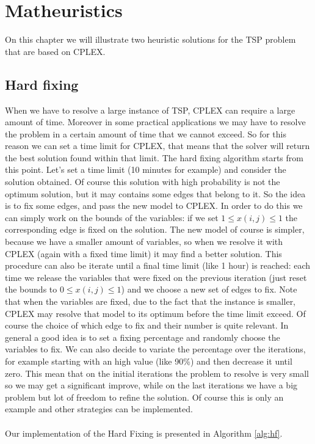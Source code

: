\chapter{Matheuristics}
On this chapter we will illustrate two heuristic solutions for the TSP problem that are based on CPLEX.

\section{Hard fixing}
When we have to resolve a large instance of TSP, CPLEX can require a large amount of time. Moreover in some practical applications we may have to resolve the problem in a certain amount of time that we cannot exceed. So for this reason we can set a time limit for CPLEX, that means that the solver will return the best solution found within that limit. The hard fixing algorithm starts from this point. Let's set a time limit (10 minutes for example) and consider the solution obtained. Of course this solution with high probability is not the optimum solution, but it may contains some edges that belong to it. So the idea is to fix some edges, and pass the new model to CPLEX. In order to do this we can simply work on the bounds of the variables: if we set $1 \leq x(i,j) \leq 1$ the corresponding edge is fixed on the solution. The new model of course is simpler, because we have a smaller amount of variables, so when we resolve it with CPLEX (again with a fixed time limit) it may find a better solution. This procedure can also be iterate until a final time limit (like 1 hour) is reached: each time we release the variables that were fixed on the previous iteration (just reset the bounds to $0 \leq x(i,j) \leq 1$) and we choose a new set of edges to fix.
Note that when the variables are fixed, due to the fact that the instance is smaller, CPLEX may resolve that model to its optimum before the time limit exceed.
Of course the choice of which edge to fix and their number is quite relevant. In general a good idea is to set a fixing percentage and randomly choose the variables to fix. We can also decide to variate the percentage over the iterations, for example starting with an high value (like 90\%) and then decrease it until zero. This mean that on the initial iterations the problem to resolve is very small so we may get a significant improve, while on the last iterations we have a big problem but lot of freedom to refine the solution. Of course this is only an example and other strategies can be implemented.  
\\\\ Our implementation of the Hard Fixing is presented in Algorithm \ref{alg:hf}. 
